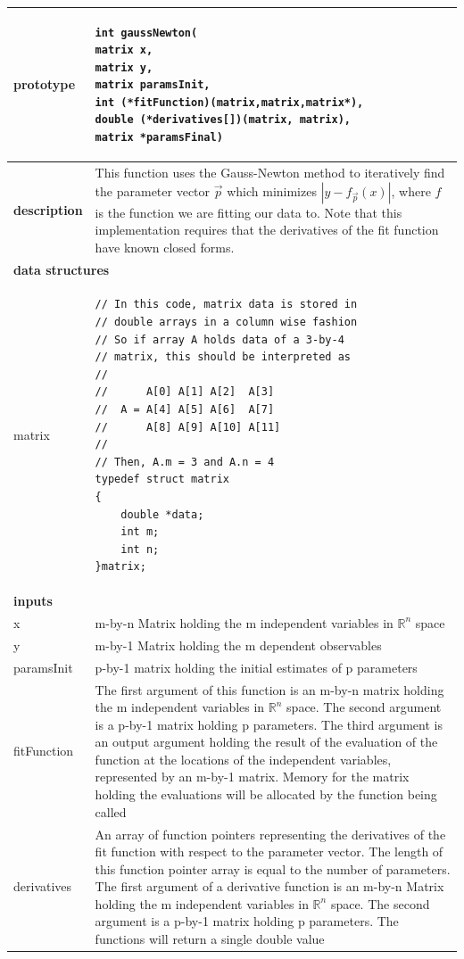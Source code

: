 \documentclass{article}
\begin{document}
\begin{center}
\begin{longtable}{|l|p{}|}
  \hline
  \textbf{prototype} & \begin{lstlisting} 
int gaussNewton(
matrix x, 
matrix y, 
matrix paramsInit,
int (*fitFunction)(matrix,matrix,matrix*),
double (*derivatives[])(matrix, matrix),
matrix *paramsFinal)
  \end{lstlisting} \\
  \hline
  \textbf{description} & This function uses the Gauss-Newton method to iteratively find the parameter vector $\overrightarrow{p}$ which minimizes $\left|y-f_{\overrightarrow{p}}(x)\right|$, where $f$ is the function we are fitting our data to. Note that this implementation requires that the derivatives of the fit function have known closed forms. \\
  \hline
  \multicolumn{2}{l}{\textbf{data structures}} \\
  \hline
  matrix & \begin{lstlisting} 
// In this code, matrix data is stored in 
// double arrays in a column wise fashion
// So if array A holds data of a 3-by-4 
// matrix, this should be interpreted as
//
//      A[0] A[1] A[2]  A[3]
//  A = A[4] A[5] A[6]  A[7]
//      A[8] A[9] A[10] A[11]
//
// Then, A.m = 3 and A.n = 4
typedef struct matrix
{
    double *data;
    int m;
    int n;
}matrix;
\end{lstlisting} \\
  \hline
  \multicolumn{2}{l}{\textbf{inputs}} \\
  \hline
  x & m-by-n Matrix holding the m independent variables in $\mathbb{R}^n$ space\\
  \hline
  y & m-by-1 Matrix holding the m dependent observables\\
  \hline
  paramsInit & p-by-1 matrix holding the initial estimates of p parameters \\
  \hline
  fitFunction & The first argument of this function is an m-by-n matrix holding the m independent variables in $\mathbb{R}^n$ space. The second argument is a p-by-1 matrix holding p parameters. The third argument is an output argument holding the result of the evaluation of the function at the locations of the independent variables, represented by an m-by-1 matrix. Memory for the matrix holding the evaluations will be allocated by the function being called\\
  \hline
  derivatives & An array of function pointers representing the derivatives of the fit function with respect to the parameter vector. The length of this function pointer array is equal to the number of parameters. The first argument of a derivative function is an m-by-n Matrix holding the m independent variables in $\mathbb{R}^n$ space. The second argument is a p-by-1 matrix holding p parameters. The functions will return a single double value\\

\end{longtable}
\end{center}
\end{document}
